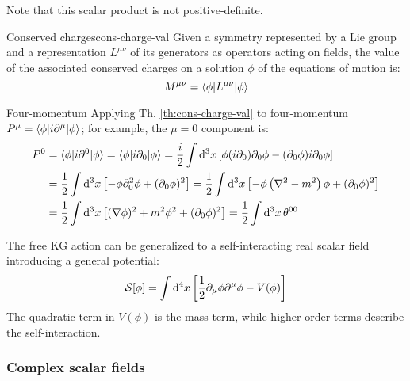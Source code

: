 Note that this scalar product is not positive-definite.

\begin{theorem}{Conserved charges}{cons-charge-val}
  Given a symmetry represented by a Lie group and a representation $ L^{\mu \nu} $ of its generators as operators acting on fields, the value of the associated conserved charges on a solution $ \phi $ of the equations of motion is:
  \begin{equation}
    M^{\mu \nu} = \braket{\phi | L^{\mu \nu} | \phi}
    \label{eq:1.75}
  \end{equation}
\end{theorem}

\begin{example}{Four-momentum}{}
  Applying Th. \ref{th:cons-charge-val} to four-momentum $ P^\mu = \braket{\phi | i \partial^\mu | \phi} $; for example, the $ \mu = 0 $ component is:
  \begin{equation*}
    \begin{split}
      P^0 &= \braket{\phi | i \partial^0 | \phi} = \braket{\phi | i \partial_0 | \phi} = \frac{i}{2} \int \mathrm{d}^3 x \left[ \phi (i \partial_0) \partial_0 \phi - (\partial_0 \phi) i \partial_0 \phi \right] \\
          &= \frac{1}{2} \int \mathrm{d}^3 x \left[ - \phi \partial_0^2 \phi + (\partial_0 \phi)^2 \right] = \frac{1}{2} \int \mathrm{d}^3 x \left[ - \phi \left( \nabla^2 - m^2 \right) \phi + (\partial_0 \phi)^2 \right] \\
          &= \frac{1}{2} \int \mathrm{d}^3 x \left[ (\nabla \phi)^2 + m^2 \phi^2 + (\partial_0 \phi)^2 \right] = \frac{1}{2} \int \mathrm{d}^3 x\, \theta^{00}
    \end{split}
  \end{equation*}
\end{example}

The free KG action can be generalized to a self-interacting real scalar field introducing a general potential:
\begin{equation}
  \mathcal{S}[\phi] = \int \mathrm{d}^4 x \left[ \frac{1}{2} \partial_\mu \phi \partial^\mu \phi - V(\phi) \right]
  \label{eq:1.76}
\end{equation}
The quadratic term in $ V(\phi) $ is the mass term, while higher-order terms describe the self-interaction.

\subsubsection{Complex scalar fields}

